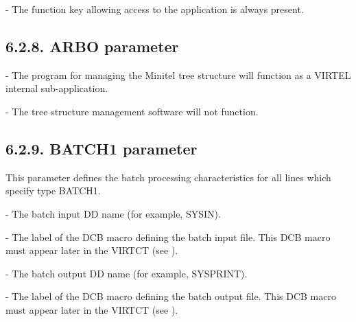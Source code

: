 \documentclass[letterpaper,10pt,english]{sphinxmanual}
\begin{document}
 - The function key allowing access to the application is always present.


\subsection{6.2.8. ARBO parameter}
\label{\detokenize{Installation_Guide:arbo-parameter}}
\begin{sphinxVerbatim}[commandchars=\\\{\}]
 
\end{sphinxVerbatim}

 - The program for managing the Minitel tree structure will function as a VIRTEL internal sub-application.

 - The tree structure management software will not function.


\subsection{6.2.9. BATCH1 parameter}
\label{\detokenize{Installation_Guide:batch1-parameter}}
\begin{sphinxVerbatim}[commandchars=\\\{\}]
   
\end{sphinxVerbatim}

This parameter defines the batch processing characteristics for all lines which specify type BATCH1.

 - The batch input DD name (for example, SYSIN).

 - The label of the DCB macro defining the batch input file. This DCB macro must appear later in the VIRTCT (see {\hyperref[\detokenize{Installation_Guide:v457ig-bookmark72}]{}}).

 - The batch output DD name (for example, SYSPRINT).

 - The label of the DCB macro defining the batch output file. This DCB macro must appear later in the VIRTCT (see {\hyperref[\detokenize{Installation_Guide:v457ig-bookmark72}]{}}).
\end{document}
